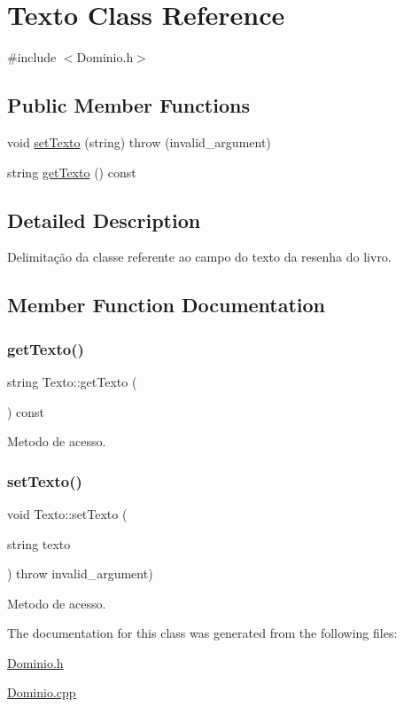 \hypertarget{class_texto}{}\section{Texto Class Reference}
\label{class_texto}


{\ttfamily \#include $<$Dominio.\+h$>$}

\subsection*{Public Member Functions}
\begin{DoxyCompactItemize}
\item 
void \hyperlink{class_texto_a2757e0409bd76bb77c8eb6ecb09cc69d}{set\+Texto} (string)  throw (invalid\+\_\+argument)
\item 
string \hyperlink{class_texto_a69463b543f36eaf86076ef48c896987f}{get\+Texto} () const
\end{DoxyCompactItemize}


\subsection{Detailed Description}
Delimitação da classe referente ao campo do texto da resenha do livro. 

\subsection{Member Function Documentation}
\mbox{\label{class_texto_a69463b543f36eaf86076ef48c896987f}} 
\subsubsection{\texorpdfstring{get\+Texto()}{getTexto()}}
{\footnotesize\ttfamily string Texto\+::get\+Texto (\begin{DoxyParamCaption}{ }\end{DoxyParamCaption}) const\hspace{0.3cm}{\ttfamily [inline]}}

Metodo de acesso. \mbox{\label{class_texto_a2757e0409bd76bb77c8eb6ecb09cc69d}} 
\subsubsection{\texorpdfstring{set\+Texto()}{setTexto()}}
{\footnotesize\ttfamily void Texto\+::set\+Texto (\begin{DoxyParamCaption}\item[{string}]{texto }\end{DoxyParamCaption}) throw  invalid\+\_\+argument) }

Metodo de acesso. 

The documentation for this class was generated from the following files\+:\begin{DoxyCompactItemize}
\item 
\hyperlink{_dominio_8h}{Dominio.\+h}\item 
\hyperlink{_dominio_8cpp}{Dominio.\+cpp}\end{DoxyCompactItemize}
